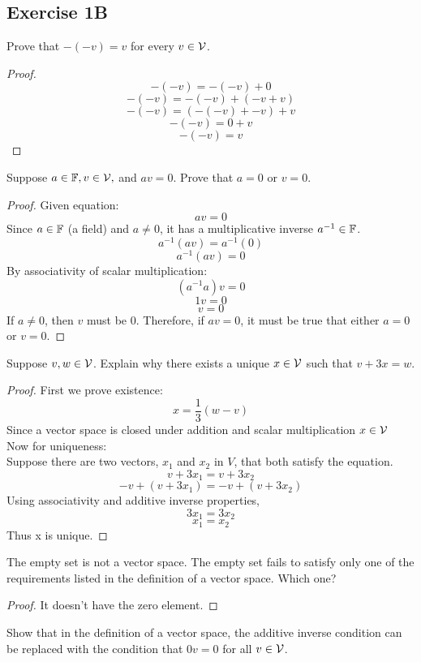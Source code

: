 \subsection{Exercise 1B}
\setcounter{question}{0}
\begin{question}
	Prove that $-(-v) = v$ for every $v \in \mathcal{V}$.   
\end{question}
\begin{proof}
	$$-(-v) = -(-v) + 0$$$$-(-v) = -(-v) + (-v + v)$$$$-(-v) = (-(-v) + -v) + v$$$$-(-v) = 0 + v$$$$-(-v) = v$$
\end{proof}
\begin{question}
	Suppose $a \in \mathbb{F}, v \in \mathcal{V},$ and $av = 0$. Prove that $a = 0$ or $v = 0$.   
\end{question}
\begin{proof}
	Given equation:$$av = 0$$
	Since $a \in \mathbb{F}$ (a field) and $a \neq 0$, it has a multiplicative inverse $a^{-1} \in \mathbb{F}$.
	$$a^{-1}(av) = a^{-1}(0)$$
	$$a^{-1}(av) = 0$$
	By associativity of scalar multiplication:
	$$(a^{-1}a)v = 0$$
	$$1v = 0$$
	$$v = 0$$
	If $a \neq 0$, then $v$ must be $0$. Therefore, if $av = 0$, it must be true that either $a = 0$ or $v = 0$.
\end{proof}
\begin{question}
	Suppose $v, w \in \mathcal{V}$. Explain why there exists a unique $x \in \mathcal{V}$ such that $v + 3x = w$.   
\end{question}
\begin{proof}
	First we prove existence:
	$$x = \frac{1}{3}(w - v)$$
	Since a vector space is closed under addition and scalar multiplication $x \in \mathcal{V}$\\
	Now for uniqueness:\\
	Suppose there are two vectors, $x_1$ and $x_2$ in $V$, that both satisfy the equation.
	$$v + 3x_1 = v + 3x_2$$
	$$-v + (v + 3x_1) = -v + (v + 3x_2)$$
	Using associativity and additive inverse properties,
	$$3x_1 = 3x_2$$
	$$x_1 = x_2$$
	Thus x is unique.
\end{proof}
\begin{question}
	The empty set is not a vector space. The empty set fails to satisfy only one of the requirements listed in the definition of a vector space. Which one?   
\end{question}
\begin{proof}
	It doesn't have the zero element.
\end{proof}
\begin{question}
	Show that in the definition of a vector space, the additive inverse condition can be replaced with the condition that $0v = 0$ for all $v \in \mathcal{V}$.   
\end{question}
